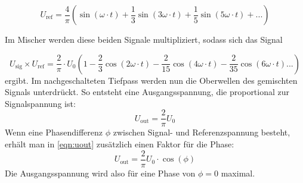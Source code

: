 \begin{equation}
    U_\text{ref} = \frac{4}{\pi}(\sin(\omega \cdot t) + \frac{1}{3}\sin(3\omega \cdot t) +  \frac{1}{5}\sin(5\omega \cdot t) + ...)
    \label{eqn:uref}
\end{equation}
\noindent

Im Mischer werden diese beiden Signale multipliziert, sodass sich das Signal 

\begin{equation}
    U_\text{sig} \times U_\text{ref} = \frac{2}{\pi} \cdot U_0(1 - \frac{2}{3}\cos(2\omega \cdot t)  -  \frac{2}{15}\cos(4\omega \cdot t) - \frac{2}{35}\cos(6\omega \cdot t)...)
    \label{eqn:urefsig}
\end{equation}
\noindent
ergibt. Im nachgeschalteten Tiefpass werden nun die Oberwellen des gemischten Signals unterdrückt. So entsteht eine Ausgangsspannung, die proportional zur Signalspannung ist:
\begin{equation}
    U_\text{out} = \frac{2}{\pi} U_0 
    \label{eqn:uout}
\end{equation}
\noindent
Wenn eine Phasendifferenz $\phi$ zwischen Signal- und Referenzspannung besteht, erhält man in \autoref{eqn:uout} zusätzlich einen Faktor für die Phase:
\begin{equation}
    U_\text{out} = \frac{2}{\pi} U_0 \cdot \cos(\phi)
    \label{eqn:uout2}
\end{equation}
\noindent
Die Ausgangsspannung wird also für eine Phase von $\phi=0$ maximal.
